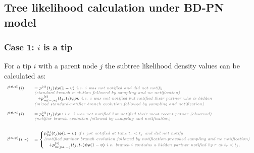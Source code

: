 \documentclass[10pt,letterpaper]{article}
\begin{document}
\subsection*{Tree likelihood calculation under BD-PN model}

\subsubsection*{Case 1: $i$ is a tip} 

For a tip $i$ with a parent node $j$ the subtree likelihood density values can be calculated as:
\begin{equation}
\scriptsize
\begin{array}{ll}
l^{(\not{n},\not{n})}(i) &= p^{(i)}(t_j)\psi\rho (1-\upsilon) \textit{\color{gray} ~i.e. $i$ was not notified and did not notify}\\
& \textit{\color{gray} (standard branch evolution followed by sampling and no notification)}\\
&~~+p_{m(-,n)}^{(i)}(t_j,t_i)\psi\rho\upsilon \textit{\color{gray} ~i.e. $i$ was not notified but notified their partner who is hidden}\\
& \textit{\color{gray} (mixed standard-notifier branch evolution followed by sampling and notification)}\\
\\
l^{(\not{n},n)}(i) &= p_n^{(i)}(t_j)\psi\rho
\upsilon \textit{\color{gray} ~i.e. $i$ was not notified but notified their most recent patner (observed)}\\
& \textit{\color{gray} (notifier branch evolution followed by sampling and notification)}\\
&~~\\
\\
l^{(n,\not{n})}(i,r) &= \begin{cases}
p_{pa}^{(i)}(t_j)\phi(1 - \upsilon) \textit{\color{gray} ~if $i$ got notified at time $t_r < t_j$ and did not notify}\\
\textit{\color{gray} (notified partner branch evolution followed by notification-provoked sampling and no notification)}
\\
~~~+p_{m(pa,-)}^{(i)}(t_j,t_r)\psi\rho(1-\upsilon) \textit{\color{gray} ~i.e. branch $i$ contains a hidden partner notified by $r$ at $t_r < t_j$, }\\

\end{cases}
\end{array}
\end{equation}
\end{document}

